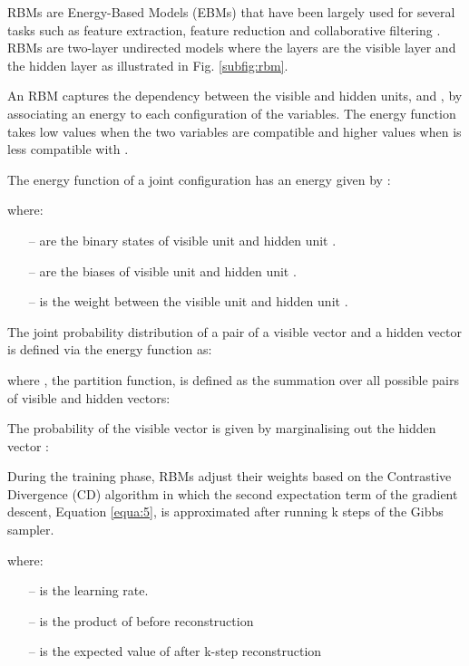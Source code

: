 \documentclass[runningheads]{llncs}
\begin{document}
\acp{RBM} are Energy-Based Models (EBMs) that have been largely used for several tasks such as feature extraction, feature reduction and collaborative filtering \cite{Hinton,Salakhutdinov}. \acp{RBM} are two-layer undirected models where the layers are the visible layer and the hidden layer as illustrated in Fig. \ref{subfig:rbm}.



An \ac{RBM} captures the dependency between the visible and hidden units,  and , by associating an energy to each configuration of the variables. The energy function takes low values when the two variables are compatible and higher values when  is less compatible with .

The energy function of a joint configuration  has an energy given by \cite{Geoffrey}:




where:
\begin{itemize}
     \item[--]  are the binary states of visible unit  and hidden unit .
     \item[--]  are the biases of visible unit  and hidden unit .
     \item[--]  is the weight between the visible unit  and hidden unit .
 \end{itemize}

The joint probability distribution of a pair of a visible vector  and a hidden vector  is defined via the energy function as:




where , the partition function, is defined as the summation over all possible pairs of visible and hidden vectors:



The probability of the visible vector  is given by marginalising out the hidden vector :



During the training phase, \acp{RBM} adjust their weights based on the Contrastive Divergence (CD) algorithm in which the second expectation term of the gradient descent, Equation \ref{equa:5}, is approximated after running k steps of the Gibbs sampler.



where:
\begin{itemize}
 \item[--]  is the learning rate.
 \item[--]  is the product of  before reconstruction
 \item[--]  is the expected value of  after k-step reconstruction
\end{itemize}
\end{document}
